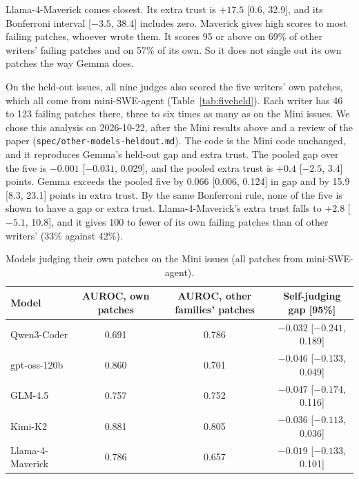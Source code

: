 \documentclass[10pt,letterpaper]{article}
\begin{document}
Llama-4-Maverick comes closest. Its extra trust is $+17.5$ [0.6, 32.9], and its Bonferroni interval [$-3.5$, %
38.4] includes zero. Maverick gives high scores to most failing patches, whoever wrote them. It scores 95 or above on
69\% of other writers' failing patches and on 57\% of its own. So it does not single out its own patches the way Gemma
does.

On the held-out issues, all nine judges also scored the five writers' own patches, which all come from mini-SWE-agent %
(Table~\ref{tab:fiveheld}). Each writer has 46 to 123 failing patches there, three to six times as many as on the Mini
issues. We chose this analysis on 2026-10-22, after the Mini results above and a review of the paper
(\texttt{spec/other-models-heldout.md}). The code is the Mini code unchanged, and it reproduces Gemma's held-out gap
and extra trust. The pooled gap over the five is $-0.001$ [$-0.031$, 0.029], and the
pooled extra trust is $+0.4$ [$-2.5$, 3.4] points. Gemma exceeds the pooled five by 0.066 [0.006, 0.124] in gap
and by 15.9 [8.3, 23.1] points in extra trust. By the same Bonferroni rule, none of the five is shown to have a gap or
extra trust. Llama-4-Maverick's extra trust falls to $+2.8$ [$-5.1$, 10.8], and it gives 100 to fewer of its own
failing patches than of other writers' (33\% against 42\%).

\begin{table}[H]
\centering
\small
\caption{Models judging their own patches on the Mini issues (all patches from mini-SWE-agent).}
\label{tab:five}
\begin{tabular}{@{}lccc@{}}
\toprule
Model & AUROC, own patches & AUROC, other families' patches & Self-judging gap [95\%] \\
\midrule
Qwen3-Coder & 0.691 & 0.786 & $-0.032$ [$-0.241$, 0.189] \\
gpt-oss-120b & 0.860 & 0.701 & $-0.046$ [$-0.133$, 0.049] \\
GLM-4.5 & 0.757 & 0.752 & $-0.047$ [$-0.174$, 0.116] \\
Kimi-K2 & 0.881 & 0.805 & $-0.036$ [$-0.113$, 0.036] \\
Llama-4-Maverick & 0.786 & 0.657 & $-0.019$ [$-0.133$, 0.101] \\
\bottomrule
\end{tabular}
\end{table}
\end{document}
